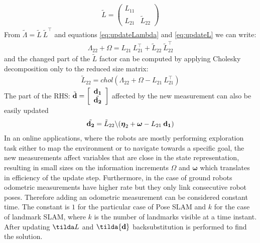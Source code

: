 \documentclass{article}
\newcommand{\tr}{^{\!\top}}
\begin{document}
{\begin{eqnarray}
%
\tilde L= \left (\begin{array}{cc} 
 L_{11} & \\
 L_{21} &  \tilde L_{22}
\end{array} \right )
\label{eq:updateL}
\end{eqnarray}
%
From $\tilde \Lambda = \tilde L\:\tilde L\tr$ and equations \ref{eq:updateLambda} and \ref{eq:updateL} we can write: 
%
\begin{eqnarray}
 \Lambda_{22}+\Omega= L_{21}\: L_{21}\tr  +  \tilde L_{22}\: \tilde L_{22}\tr
\label{eq:L22a}
\end{eqnarray}
%
and the changed part of the $\tilde L$ factor can be computed by applying Cholesky decomposition only to the reduced size matrix:
%
\begin{eqnarray}
 \tilde L_{22}= chol(\Lambda_{22}+\Omega-L_{21}\: L_{21}\tr)
\label{eq:L22b}
\end{eqnarray}
%
The part of the RHS: $\tilde {\bf d}=\left[\begin{array}{c} {\bf d_1}\\ \tilde{\bf d_2}\end{array}\right]$ affected by the new measurement can also be easily updated
\begin{eqnarray}
 \tilde {\bf d_2}= \tilde L_{22}\backslash ({\boldsymbol \eta}_{2}+{\boldsymbol \omega} -L_{21}\: {\bf d_1})
\label{eq:L22b}
\end{eqnarray}
%
In an online applications, where the robots are mostly performing exploration task either to map the environment or to navigate towards a specific goal, the new measurements affect variables that are close in the state representation, resulting in small sizes on the information increments $\Omega$  and ${\boldsymbol \omega}$ which translates in efficiency of the update step. Furthermore, in the case of ground robots odometric measurements have higher rate but they only link consecutive robot poses. Therefore adding an odometric measurement can be considered constant time. The constant is $1$ for the particular case of Pose SLAM and $k$ for the case of landmark SLAM, where $k$ is the number of landmarks visible at a time instant.
\\
After updating $\tilda L$ and $\tilda {\bf d}$ backsubstitution is performed to find the solution. 
\\
}
\end{document}
